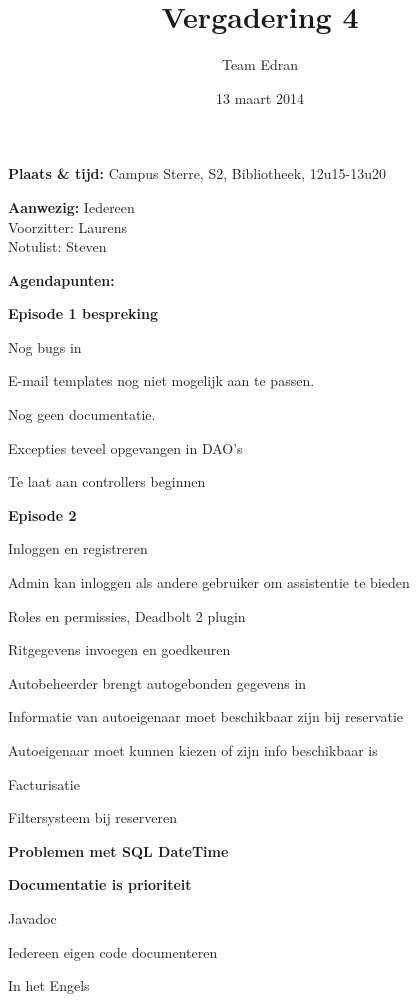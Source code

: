\documentclass[11pt,a4paper,oneside]{article}
\title{Vergadering 4}
\author{Team Edran}
\date{13 maart 2014}
\renewenvironment{itemize}[1]{\begin{compactitem}#1}{\end{compactitem}}
\begin{document}
\maketitle

\textbf{Plaats \& tijd:}
Campus Sterre, S2, Bibliotheek, 12u15-13u20

\textbf{Aanwezig:}
Iedereen\\
Voorzitter: Laurens\\
Notulist: Steven

\textbf{Agendapunten:}

\begin{itemize}
    \item \textbf{Episode 1 bespreking}
        \begin{itemize}
           \item Nog bugs in 
	\item E-mail templates nog niet mogelijk aan te passen. 
	\item Nog geen documentatie.
	\item Excepties teveel opgevangen in DAO's
	\item Te laat aan controllers beginnen
        \end{itemize}

    \item \textbf{Episode 2}
        \begin{itemize}
           \item Inloggen en registreren
		\item Admin kan inloggen als andere gebruiker om assistentie te bieden
		\item Roles en permissies, Deadbolt 2 plugin
		\item Ritgegevens invoegen en goedkeuren
		\item Autobeheerder brengt autogebonden gegevens in
		\item Informatie van autoeigenaar moet beschikbaar zijn bij reservatie
		\item Autoeigenaar moet kunnen kiezen of zijn info beschikbaar is
		\item Facturisatie
		\item Filtersysteem bij reserveren
        \end{itemize}

	 \item \textbf{Problemen met SQL DateTime}
	
		 \item \textbf{Documentatie is prioriteit}
		\begin{itemize}
           \item Javadoc 
	\item Iedereen eigen code documenteren
	\item In het Engels
        \end{itemize}


\end{itemize}
\end{document}
